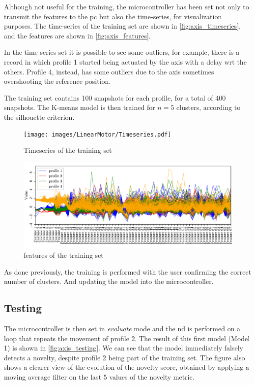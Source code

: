Although not useful for the training, the microcontroller has been set not only to transmit the features to the \gls{pc} but also the time-series, for visualization purposes. The time-series of the training set are shown in \autoref{fig:axis_timeseries}, and the features are shown in \autoref{fig:axis_features}.

In the time-series set it is possible to see some outliers, for example, there is a record in which profile 1 started being actuated by the axis with a delay \gls{wrt} the others. Profile 4, instead, has some outliers due to the axis sometimes overshooting the reference position.

The training set contains 100 snapshots for each profile, for a total of 400 snapshots. The K-means model is then trained for $n=5$ clusters, according to the silhouette criterion.

\begin{figure}
    \centering
    \texttt{[image: images/LinearMotor/Timeseries.pdf]}
    \caption{Timeseries of the training set}
    \label{fig:axis_timeseries}
\end{figure}


\begin{figure}
    \centering
    \includegraphics[width=\textwidth]{images/LinearMotor/Features.pdf}
    \caption{features of the training set}
    \label{fig:axis_features}
\end{figure}

As done previously, the training is performed with the user confirming the correct number of clusters. And updating the model into the microcontroller.

\subsection{Testing}
The microcontroller is then set in \emph{evaluate} mode and the \gls{nd} is performed on a loop that repeats the movement of profile 2. The result of this first model (Model 1) is shown in \autoref{fig:axis_testing}. We can see that the model immediately falsely detects a novelty, despite profile 2 being part of the training set. The figure also shows a clearer view of the evolution of the novelty score, obtained by applying a moving average filter on the last 5 values of the novelty metric.

